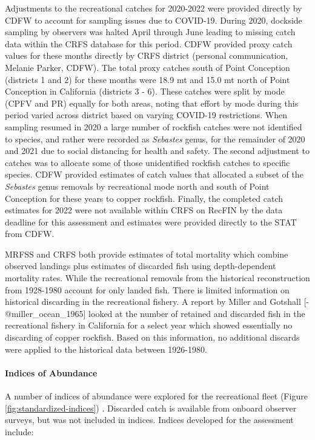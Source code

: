 \documentclass[11pt,
  letterpaper,
]{article}
\begin{document}
Adjustments to the recreational catches for 2020-2022 were provided directly by CDFW to account for sampling issues due to COVID-19. During 2020, dockside sampling by observers was halted April through June leading to missing catch data within the CRFS database for this period. CDFW provided proxy catch values for these months directly by CRFS district (personal communication, Melanie Parker, CDFW). The total proxy catches south of Point Conception (districts 1 and 2) for these months were 18.9 mt and 15.0 mt north of Point Conception in California (districts 3 - 6). These catches were split by mode (CPFV and PR) equally for both areas, noting that effort by mode during this period varied across district based on varying COVID-19 restrictions. When sampling resumed in 2020 a large number of rockfish catches were not identified to species, and rather were recorded as \emph{Sebastes} genus, for the remainder of 2020 and 2021 due to social distancing for health and safety. The second adjustment to catches was to allocate some of those unidentified rockfish catches to specific species. CDFW provided estimates of catch values that allocated a subset of the \emph{Sebastes} genus removals by recreational mode north and south of Point Conception for these years to copper rockfish. Finally, the completed catch estimates for 2022 were not available within CRFS on RecFIN by the data deadline for this assessment and estimates were provided directly to the STAT from CDFW.

MRFSS and CRFS both provide estimates of total mortality which combine observed landings plus estimates of discarded fish using depth-dependent mortality rates. While the recreational removals from the historical reconstruction from 1928-1980 account for only landed fish. There is limited information on historical discarding in the recreational fishery. A report by Miller and Gotshall {[}-@miller\_ocean\_1965{]} looked at the number of retained and discarded fish in the recreational fishery in California for a select year which showed essentially no discarding of copper rockfish. Based on this information, no additional discards were applied to the historical data between 1926-1980.

\paragraph{Indices of Abundance}\label{indices-of-abundance}

\hfill\break

A number of indices of abundance were explored for the recreational fleet (Figure \ref{fig:standardized-indices}) . Discarded catch is available from onboard observer surveys, but was not included in indices. Indices developed for the assessment include:
\end{document}

